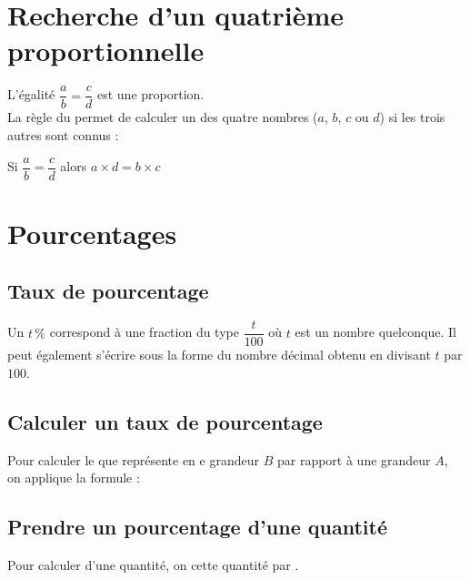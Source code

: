 \documentclass[12pt,a4paper]{article}
\begin{document}


\section{Recherche d'un quatrième proportionnelle}

\begin{mymeth}{}
	L'égalité $\dfrac{a}{b}=\dfrac{c}{d}$ est une proportion.\\
	
	La règle du  permet de calculer un des quatre nombres ($a$, $b$, $c$ ou $d$) si les trois autres sont connus :
	
	\begin{center}
		Si $\dfrac{a}{b} = \dfrac{c}{d}$ alors $a \times d = b \times c$
	\end{center}
\end{mymeth}



\section{Pourcentages}

\subsection{Taux de pourcentage}
\begin{mydef}
	Un  $t\, \% $ correspond à une fraction du type $\dfrac{t}{100}$ où $t$ est un nombre quelconque. Il peut également s'écrire sous la forme du nombre décimal obtenu en divisant $t$ par $100$.
	
\end{mydef}

\subsection{Calculer un taux de pourcentage}
\begin{mymeth}
	Pour calculer le  que représente en e grandeur $B$ par rapport à une grandeur $A$, on applique la formule :
	
	\begin{center}
	\end{center}
	
\end{mymeth}



\subsection{Prendre un pourcentage d'une quantité}
\begin{mymeth}
	Pour calculer  d'une quantité, on  cette quantité par .
	
\end{mymeth}

	
\end{document}
